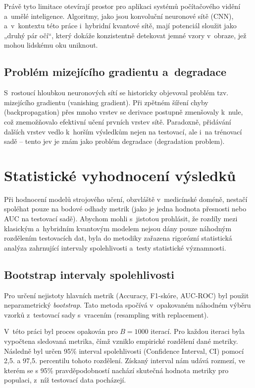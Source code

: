 \documentclass[12pt, a4paper]{report}
\begin{document}
Právě tyto limitace otevírají prostor pro aplikaci systémů počítačového vidění a~umělé inteligence.
Algoritmy, jako jsou konvoluční neuronové sítě (CNN), a~v~kontextu této práce i~hybridní kvantové sítě, mají potenciál sloužit jako „druhý pár očí“, který dokáže konzistentně detekovat jemné vzory v~obraze, jež mohou lidskému oku uniknout.

\subsection{Problém mizejícího gradientu a~degradace}
S~rostoucí hloubkou neuronových sítí se historicky objevoval problém tzv. mizejícího gradientu (vanishing gradient).
Při zpětném šíření chyby (backpropagation) přes mnoho vrstev se derivace postupně zmenšovaly k~nule, což znemožňovalo efektivní učení prvních vrstev sítě.
Paradoxně, přidávání dalších vrstev vedlo k~horším výsledkům nejen na testovací, ale i~na trénovací sadě – tento jev je znám jako problém degradace (degradation problem).

\section{Statistické vyhodnocení výsledků} \label{sec:statistika}

Při hodnocení modelů strojového učení, obzvláště v~medicínské doméně, nestačí spoléhat pouze na bodové odhady metrik (jako je jedna hodnota přesnosti nebo AUC na testovací sadě). Abychom mohli s~jistotou prohlásit, že rozdíly mezi klasickým a~hybridním kvantovým modelem nejsou dány pouze náhodným rozdělením testovacích dat, byla do metodiky zařazena rigorózní statistická analýza zahrnující intervaly spolehlivosti a~testy statistické významnosti.

\subsection{Bootstrap intervaly spolehlivosti}
Pro určení nejistoty hlavních metrik (Accuracy, F1-skóre, AUC-ROC) byl použit neparametrický \textit{bootstrap}. Tato metoda spočívá v~opakovaném náhodném výběru vzorků z~testovací sady s~vracením (resampling with replacement). 

V~této práci byl proces opakován pro $B = 1000$ iterací. Pro každou iteraci byla vypočtena sledovaná metrika, čímž vzniklo empirické rozdělení dané metriky. Následně byl určen 95\% interval spolehlivosti (Confidence Interval, CI) pomocí 2,5. a 97,5. percentilu tohoto rozdělení. Získaný interval nám udává rozmezí, ve kterém se s 95\% pravděpodobností nachází skutečná hodnota metriky pro populaci, z~níž testovací data pocházejí.
\end{document}

